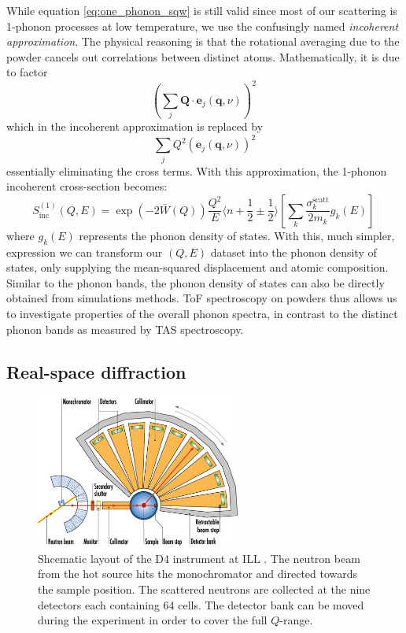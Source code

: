 While equation \ref{eq:one_phonon_sqw} is still valid since most of our scattering is 1-phonon processes at low temperature, we use the confusingly named \emph{incoherent approximation}. The physical reasoning is that the rotational averaging due to the powder cancels out correlations between distinct atoms. Mathematically, it is due to factor 
%
\[ \left( \sum_j \bm{Q} \cdot \bm{e}_j (\bm{q}, \nu) \right)^2 \, \]
%
which in the incoherent approximation is replaced by \cite{Carpenter1985}
%
\[ \sum_j  Q^2 \left( \bm{e}_j (\bm{q}, \nu) \right)^2 \]
%
essentially eliminating the cross terms. With this approximation, the 1-phonon incoherent cross-section becomes:
%
\[ S^{(1)}_{\mathrm{inc}}(Q,E) = \exp\left(-2\bar{W}(Q)\right) \frac{Q^2}{E} \langle n+\frac{1}{2}\pm\frac{1}{2} \rangle \left[ \sum_k \frac{\sigma_k^{\mathrm{scatt}}}{2m_k} g_k(E) \right]\, \]
%
where $g_k(E)$ represents the phonon density of states. With this, much simpler, expression we can transform our $(Q,E)$ dataset into the phonon density of states, only supplying the mean-squared displacement and atomic composition. Similar to the phonon bands, the phonon density of states can also be directly obtained from simulations methods. ToF spectroscopy on powders thus allows us to investigate properties of the overall phonon spectra, in contrast to the distinct phonon bands as measured by TAS spectroscopy.

\subsection{Real-space diffraction}

\begin{figure}
	\centering
	\includegraphics[width=0.6\textwidth]{fig/method/ns/d4.jpg}
	\caption[D4 layout]{Shcematic layout of the D4 instrument at ILL \cite{d4}. The neutron beam from the hot source hits the monochromator and directed towards the sample position. The scattered neutrons are collected at the nine detectors each containing 64 cells. The detector bank can be moved during the experiment in order to cover the full $Q$-range.}
	\label{fig:d4}
\end{figure}

